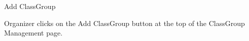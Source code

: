 
\begin{uc}{Add ClassGroup}


    \begin{uc-trig}
        Organizer clicks on the Add ClassGroup button at the top of the ClassGroup Management
        page.
    \end{uc-trig}

\end{uc}

